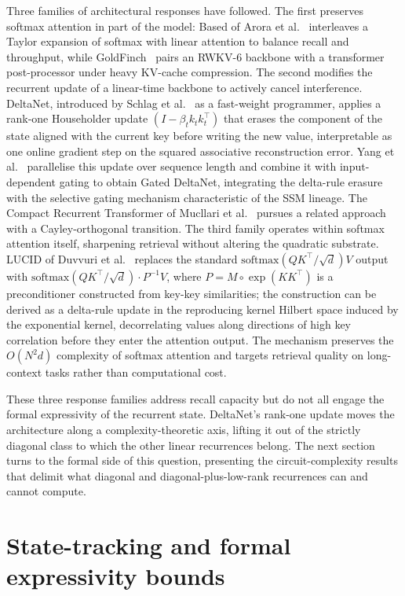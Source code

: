 Three families of architectural responses have followed. The
first preserves softmax attention in part of the model: Based of
Arora et al.~\cite{arora2024based} interleaves a Taylor expansion
of softmax with linear attention to balance recall and
throughput, while GoldFinch~\cite{goldstein2024goldfinch} pairs
an RWKV-6 backbone with a transformer post-processor under heavy
KV-cache compression. The second modifies the recurrent update
of a linear-time backbone to actively cancel interference.
DeltaNet, introduced by Schlag et al.~\cite{schlag2021deltanet}
as a fast-weight programmer, applies a rank-one Householder
update $(I - \beta_t k_t k_t^\top)$ that erases the component of
the state aligned with the current key before writing the new
value, interpretable as one online gradient step on the squared
associative reconstruction error. Yang et
al.~\cite{yang2024deltanet} parallelise this update over sequence
length and combine it with input-dependent gating to obtain
Gated DeltaNet, integrating the delta-rule erasure with the
selective gating mechanism characteristic of the SSM lineage.
The Compact Recurrent Transformer of Mucllari et
al.~\cite{mucllari2025crt} pursues a related approach with a
Cayley-orthogonal transition. The third family operates within
softmax attention itself, sharpening retrieval without altering
the quadratic substrate. LUCID of Duvvuri et
al.~\cite{duvvuri2026lucid} replaces the standard
$\mathrm{softmax}(QK^\top/\sqrt{d}) V$ output with
$\mathrm{softmax}(QK^\top/\sqrt{d}) \cdot P^{-1} V$, where
$P = M \circ \exp(KK^\top)$ is a preconditioner constructed from
key-key similarities; the construction can be derived as a
delta-rule update in the reproducing kernel Hilbert space induced
by the exponential kernel, decorrelating values along directions
of high key correlation before they enter the attention output.
The mechanism preserves the $O(N^2 d)$ complexity of softmax
attention and targets retrieval quality on long-context tasks
rather than computational cost.

These three response families address recall capacity but do not
all engage the formal expressivity of the recurrent state.
DeltaNet's rank-one update moves the architecture along a
complexity-theoretic axis, lifting it out of the strictly
diagonal class to which the other linear recurrences belong. The
next section turns to the formal side of this question,
presenting the circuit-complexity results that delimit what
diagonal and diagonal-plus-low-rank recurrences can and cannot
compute.

  \section{State-tracking and formal expressivity bounds}

